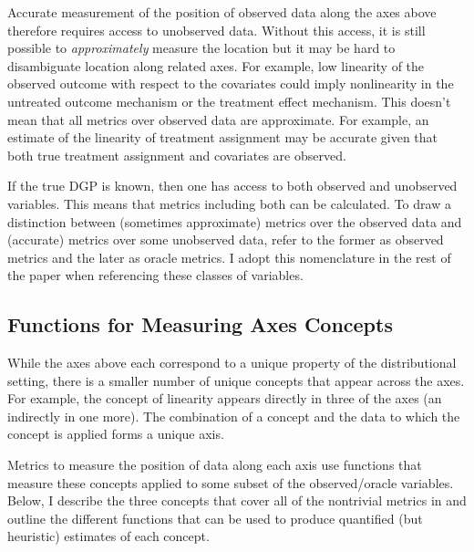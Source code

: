 \documentclass[../main.tex]{subfiles}
\begin{document}
\vspace{\baselineskip}

Accurate measurement of the position of observed data along the axes above therefore requires access to unobserved data. Without this access, it is still possible to \textit{approximately} measure the location but it may be hard to disambiguate location along related axes. For example, low linearity of the observed outcome with respect to the covariates could imply nonlinearity in the untreated outcome mechanism or the treatment effect mechanism. This doesn't mean that all metrics over observed data are approximate. For example, an estimate of the linearity of treatment assignment may be accurate given that both true treatment assignment and covariates are observed.

\vspace{\baselineskip}

If the true DGP is known, then one has access to both observed and unobserved variables. This means that metrics including both can be calculated. To draw a distinction between (sometimes approximate) metrics over the observed data and (accurate) metrics over some unobserved data, \textcite{Dorie2019Automated1} refer to the former as observed metrics and the later as oracle metrics. I adopt this nomenclature in the rest of the paper when referencing these classes of variables.

\subsection{Functions for Measuring Axes Concepts}

While the axes above each correspond to a unique property of the distributional setting, there is a smaller number of unique concepts that appear across the axes. For example, the concept of linearity appears directly in three of the axes (an indirectly in one more). The combination of a concept and the data to which the concept is applied forms a unique axis.

\vspace{\baselineskip}

Metrics to measure the position of data along each axis use functions that measure these concepts applied to some subset of the observed/oracle variables. Below, I describe the three concepts that cover all of the nontrivial metrics in \textcite{Dorie2019Automated1} and outline the different functions that can be used to produce quantified (but heuristic) estimates of each concept.
\end{document}

